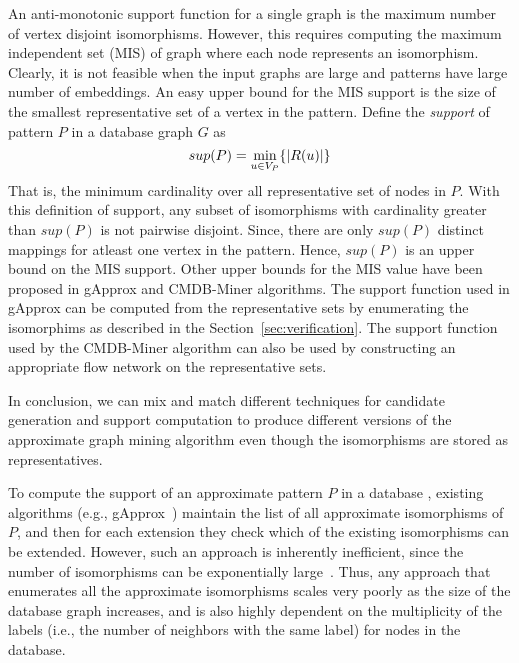 An anti-monotonic support function for a single graph is the maximum
number of vertex disjoint isomorphisms. However, this requires
computing the maximum independent set (MIS)
of graph where each node represents an isomorphism. Clearly,
it is not feasible when the input graphs are large and patterns have
large number of embeddings. An easy upper bound for the MIS support is the 
size of the smallest representative set of a vertex in the pattern.
Define the {\em
support} of pattern $P$ in a database graph $G$ as 
$$sup(P) = \min_{u \in
V_P} \{ |R(u)| \}$$
That is, the minimum cardinality over all representative set of nodes in $P$. 
With this definition of support, any subset of isomorphisms with cardinality
greater than $sup(P)$ is not pairwise disjoint. Since, there are
only $sup(P)$ distinct mappings for atleast one vertex in the pattern. Hence, $sup(P)$
is an upper bound on the MIS support. Other upper bounds for the MIS value
have been proposed in gApprox and CMDB-Miner algorithms. The support 
function used in gApprox can be computed from the representative sets 
by enumerating the isomorphims as described in the Section~\ref{sec:verification}.
The support function used by the CMDB-Miner algorithm can also be
used by constructing an appropriate flow network on the representative sets.

In conclusion, we can mix and match different techniques for candidate generation
and support computation to produce different versions of the approximate
graph mining algorithm even though the isomorphisms are stored as
representatives.

To compute the support of an approximate pattern $P$ in a database \db,
existing algorithms (e.g., gApprox~\cite{gapprox}) maintain the list of
all approximate isomorphisms of $P$, and then for each extension they
check which of the existing isomorphisms can be extended. However, such an
approach is inherently inefficient, since the number of isomorphisms can
be exponentially large~\cite{2011-icdm}.  Thus, any approach that
enumerates all the approximate isomorphisms scales very poorly as the size
of the database graph increases, and is also highly dependent on the
multiplicity of the labels (i.e., the number of neighbors with the same
label) for nodes in the database.

